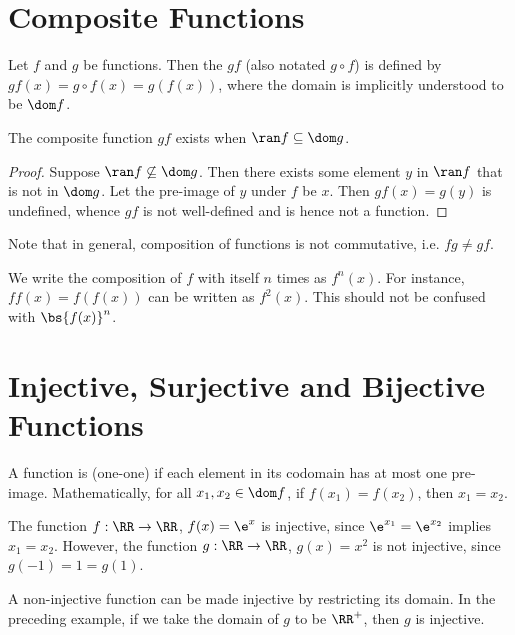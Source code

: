 \section{Composite Functions}

\begin{definition}
    Let $f$ and $g$ be functions. Then the  $gf$ (also notated $g \circ f$) is defined by $gf(x) = g \circ f(x) = g(f(x))$, where the domain is implicitly understood to be $\dom f$.
\end{definition}

\begin{proposition}
    The composite function $gf$ exists when $\ran f \subseteq \dom g$.
\end{proposition}
\begin{proof}
    Suppose $\ran f \not\subseteq \dom g$. Then there exists some element $y$ in $\ran f$ that is not in $\dom g$. Let the pre-image of $y$ under $f$ be $x$. Then $gf(x) = g(y)$ is undefined, whence $gf$ is not well-defined and is hence not a function.
\end{proof}

Note that in general, composition of functions is not commutative, i.e. $fg \neq gf$.

We write the composition of $f$ with itself $n$ times as $f^n(x)$. For instance, $ff(x) = f(f(x))$ can be written as $f^2(x)$. This should not be confused with $\bs{f(x)}^n$.

\section{Injective, Surjective and Bijective Functions}

\begin{definition}
    A function is  (one-one) if each element in its codomain has at most one pre-image. Mathematically, for all $x_1, x_2 \in \dom f$, if $f(x_1) = f(x_2)$, then $x_1 = x_2$.
\end{definition}

\begin{example}
    The function $f : \RR \to \RR$, $f(x) = \e^x$ is injective, since $\e^{x_1} = \e^{x_2}$ implies $x_1 = x_2$. However, the function $g : \RR \to \RR$, $g(x) = x^2$ is not injective, since $g(-1) = 1 = g(1)$.
\end{example}

A non-injective function can be made injective by restricting its domain. In the preceding example, if we take the domain of $g$ to be $\RR^+$, then $g$ is injective.

